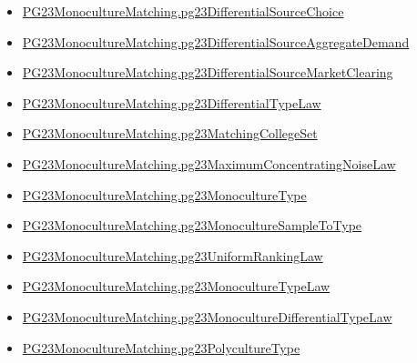 \documentclass[10pt]{article}
\begin{document}
\begin{itemize}[leftmargin=1.2em]
\begin{itemize}[leftmargin=1.2em]
\item \hyperlink{paper-prerequisite-3ee1f2afd9fb0bab}{PG23\allowbreak{}Monoculture\allowbreak{}Matching.\allowbreak{}pg23\allowbreak{}Differential\allowbreak{}Source\allowbreak{}Choice}
\item \hyperlink{paper-prerequisite-8862e3e199188580}{PG23\allowbreak{}Monoculture\allowbreak{}Matching.\allowbreak{}pg23\allowbreak{}Differential\allowbreak{}Source\allowbreak{}Aggregate\allowbreak{}Demand}
\item \hyperlink{paper-prerequisite-b0301ef9ff59e71b}{PG23\allowbreak{}Monoculture\allowbreak{}Matching.\allowbreak{}pg23\allowbreak{}Differential\allowbreak{}Source\allowbreak{}Market\allowbreak{}Clearing}
\item \hyperlink{paper-prerequisite-2ae75b2a98596b55}{PG23\allowbreak{}Monoculture\allowbreak{}Matching.\allowbreak{}pg23\allowbreak{}Differential\allowbreak{}Type\allowbreak{}Law}
\item \hyperlink{paper-prerequisite-3828b62220d17122}{PG23\allowbreak{}Monoculture\allowbreak{}Matching.\allowbreak{}pg23\allowbreak{}Matching\allowbreak{}College\allowbreak{}Set}
\item \hyperlink{paper-prerequisite-8df4ad9724d0cb72}{PG23\allowbreak{}Monoculture\allowbreak{}Matching.\allowbreak{}pg23\allowbreak{}Maximum\allowbreak{}Concentrating\allowbreak{}Noise\allowbreak{}Law}
\item \hyperlink{paper-prerequisite-b9706024b8c86426}{PG23\allowbreak{}Monoculture\allowbreak{}Matching.\allowbreak{}pg23\allowbreak{}Monoculture\allowbreak{}Type}
\item \hyperlink{paper-prerequisite-ce180956cf3f637e}{PG23\allowbreak{}Monoculture\allowbreak{}Matching.\allowbreak{}pg23\allowbreak{}Monoculture\allowbreak{}Sample\allowbreak{}To\allowbreak{}Type}
\item \hyperlink{paper-prerequisite-b9080a6bda2a8422}{PG23\allowbreak{}Monoculture\allowbreak{}Matching.\allowbreak{}pg23\allowbreak{}Uniform\allowbreak{}Ranking\allowbreak{}Law}
\item \hyperlink{paper-prerequisite-e248b62a880a6917}{PG23\allowbreak{}Monoculture\allowbreak{}Matching.\allowbreak{}pg23\allowbreak{}Monoculture\allowbreak{}Type\allowbreak{}Law}
\item \hyperlink{paper-prerequisite-b89cd6c5c3c5cca3}{PG23\allowbreak{}Monoculture\allowbreak{}Matching.\allowbreak{}pg23\allowbreak{}Monoculture\allowbreak{}Differential\allowbreak{}Type\allowbreak{}Law}
\item \hyperlink{paper-prerequisite-1b5614740ce1beb4}{PG23\allowbreak{}Monoculture\allowbreak{}Matching.\allowbreak{}pg23\allowbreak{}Polyculture\allowbreak{}Type}

\end{itemize}
\end{itemize}
\end{document}
